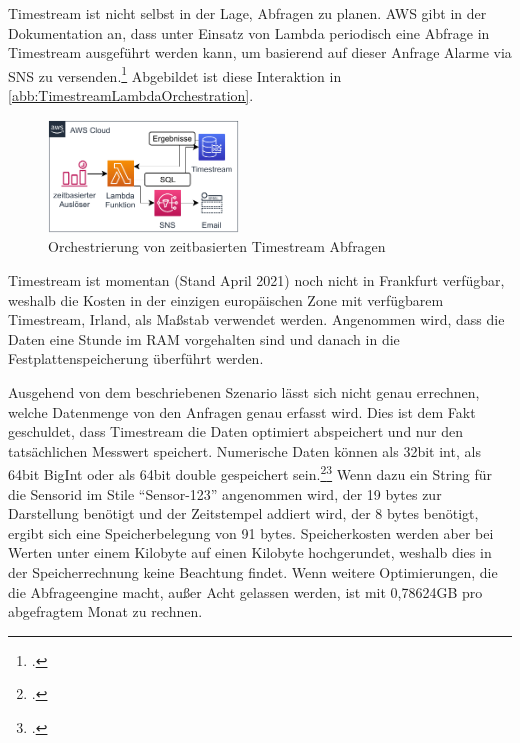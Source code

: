Timestream ist nicht selbst in der Lage, Abfragen zu planen. \ac{AWS} gibt in der Dokumentation an, dass unter Einsatz von Lambda periodisch eine Abfrage in Timestream ausgeführt werden kann, um basierend auf dieser Anfrage Alarme via \ac{SNS} zu versenden.\footcite[Vgl.][]{AmazonWebServicesInc..o.J.ag} Abgebildet ist diese Interaktion in \autoref{abb:TimestreamLambdaOrchestration}.


\begin{figure}[H]
\centering
\includegraphics[width=0.45\textwidth]{graphics/Lambda-Timestream-Orchestration.pdf}
\caption{Orchestrierung von zeitbasierten Timestream Abfragen}
\label{abb:TimestreamLambdaOrchestration}
\end{figure}

Timestream ist momentan (Stand April 2021) noch nicht in Frankfurt verfügbar, weshalb die Kosten in der einzigen europäischen Zone mit verfügbarem Timestream, Irland, als Maßstab verwendet werden. Angenommen wird, dass die Daten eine Stunde im \ac{RAM} vorgehalten sind und danach in die Festplattenspeicherung überführt werden.

Ausgehend von dem beschriebenen Szenario lässt sich nicht genau errechnen, welche Datenmenge von den Anfragen genau erfasst wird. Dies ist dem Fakt geschuldet, dass Timestream die Daten optimiert abspeichert und nur den tatsächlichen Messwert speichert. Numerische Daten können als 32bit int, als 64bit BigInt oder als 64bit double gespeichert sein.\footcite[Vgl. auch im Folgenden][]{AmazonWebServicesInc..o.J.r}\nzitat\footcite[Vgl. auch im Folgenden][]{AmazonWebServicesInc..o.J.q} Wenn dazu ein String für die Sensorid im Stile \enquote{Sensor-123} angenommen wird, der 19 bytes zur Darstellung benötigt und der Zeitstempel addiert wird, der 8 bytes benötigt, ergibt sich eine Speicherbelegung von 91 bytes. Speicherkosten werden aber bei Werten unter einem Kilobyte auf einen Kilobyte hochgerundet, weshalb dies in der Speicherrechnung keine Beachtung findet. Wenn weitere Optimierungen, die die Abfrageengine macht, außer Acht gelassen werden, ist mit 0,78624GB pro abgefragtem Monat zu rechnen.


